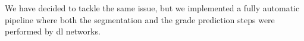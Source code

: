 %
%
%
%
%
We have decided to tackle the same issue, but we implemented a fully
automatic pipeline where both the segmentation and the grade prediction
steps were performed by \ac{dl} networks.

